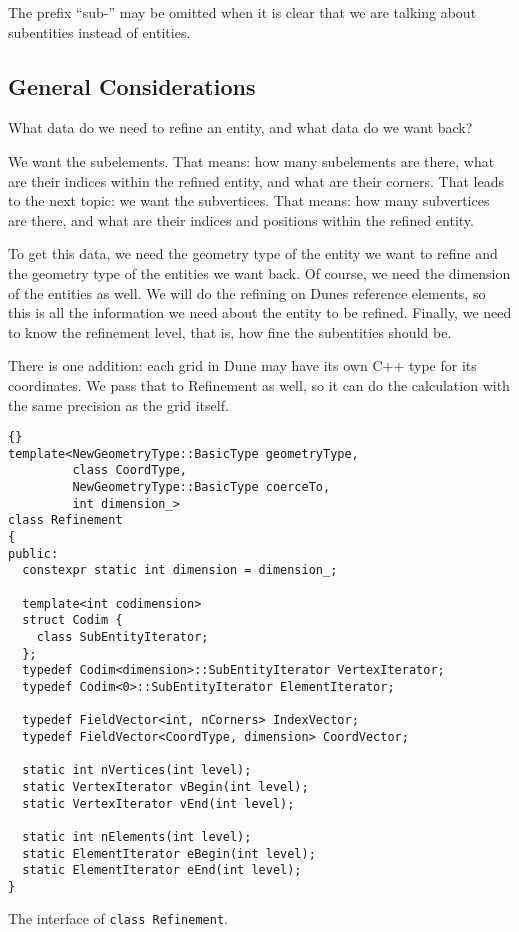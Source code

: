 \documentclass[english,a4paper]{article}
\newcommand{\code}[1]{\textnormal{\lstinline{#1}}}
\begin{document}
The prefix ``sub-'' may be omitted when it is clear that we are
talking about subentities instead of entities.

\subsection{General Considerations}

What data do we need to refine an entity, and what data do we want
back?

We want the subelements.  That means: how many subelements are
there, what are their indices within the refined entity, and what are
their corners.  That leads to the next topic: we want the subvertices.
That means: how many subvertices are there, and what are their indices
and positions within the refined entity.

To get this data, we need the geometry type of the entity we want to
refine and the geometry type of the entities we want back.  Of course,
we need the dimension of the entities as well.  We will do the
refining on Dunes reference elements, so this is all the information
we need about the entity to be refined.  Finally, we need to know the
refinement level, that is, how fine the subentities should be.

There is one addition: each grid in Dune may have its own C++ type for
its coordinates.  We pass that to Refinement as well, so it can do the
calculation with the same precision as the grid itself.

\begin{Listing}
  \begin{lstlisting}{}
template<NewGeometryType::BasicType geometryType,
         class CoordType,
         NewGeometryType::BasicType coerceTo,
         int dimension_>
class Refinement
{
public:
  constexpr static int dimension = dimension_;

  template<int codimension>
  struct Codim {
    class SubEntityIterator;
  };
  typedef Codim<dimension>::SubEntityIterator VertexIterator;
  typedef Codim<0>::SubEntityIterator ElementIterator;

  typedef FieldVector<int, nCorners> IndexVector;
  typedef FieldVector<CoordType, dimension> CoordVector;

  static int nVertices(int level);
  static VertexIterator vBegin(int level);
  static VertexIterator vEnd(int level);

  static int nElements(int level);
  static ElementIterator eBegin(int level);
  static ElementIterator eEnd(int level);
}
  \end{lstlisting}
  \caption{The interface of \code{class Refinement}.}
  \label{intf_stat}
\end{Listing}
\end{document}

